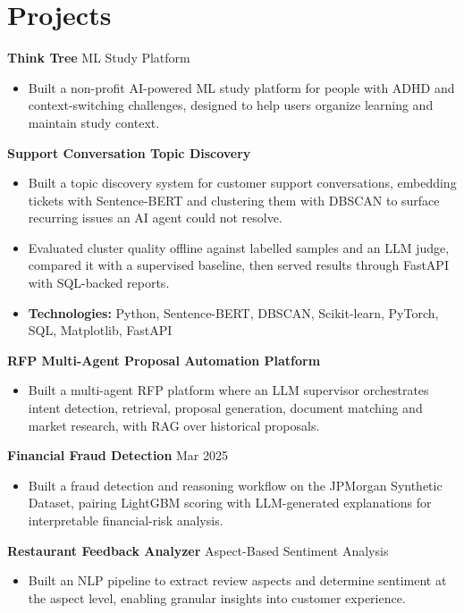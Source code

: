\documentclass[10pt,a4paper]{article}
\begin{document}
\section{Projects}
\textbf{Think Tree} \textbar{} ML Study Platform\par
\begin{itemize}
  \item Built a non-profit AI-powered ML study platform for people with ADHD and context-switching challenges, designed to help users organize learning and maintain study context.
\end{itemize}
\textbf{Support Conversation Topic Discovery}\par
\begin{itemize}
  \item Built a topic discovery system for customer support conversations, embedding tickets with Sentence-BERT and clustering them with DBSCAN to surface recurring issues an AI agent could not resolve.
  \item Evaluated cluster quality offline against labelled samples and an LLM judge, compared it with a supervised baseline, then served results through FastAPI with SQL-backed reports.
  \item \textbf{Technologies:} Python, Sentence-BERT, DBSCAN, Scikit-learn, PyTorch, SQL, Matplotlib, FastAPI
\end{itemize}
\textbf{RFP Multi-Agent Proposal Automation Platform}\par
\begin{itemize}
  \item Built a multi-agent RFP platform where an LLM supervisor orchestrates intent detection, retrieval, proposal generation, document matching and market research, with RAG over historical proposals.
\end{itemize}
\textbf{Financial Fraud Detection} \textbar{} Mar 2025\par
\begin{itemize}
  \item Built a fraud detection and reasoning workflow on the JPMorgan Synthetic Dataset, pairing LightGBM scoring with LLM-generated explanations for interpretable financial-risk analysis.
\end{itemize}
\textbf{Restaurant Feedback Analyzer} \textbar{} Aspect-Based Sentiment Analysis\par
\begin{itemize}
  \item Built an NLP pipeline to extract review aspects and determine sentiment at the aspect level, enabling granular insights into customer experience.
\end{itemize}
\end{document}
